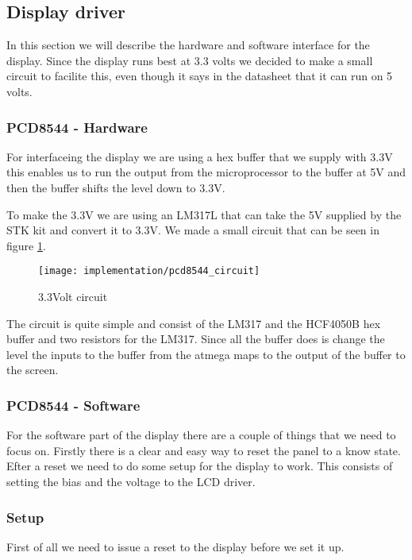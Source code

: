 \subsection{Display driver}
In this section we will describe the hardware and software interface for the display.
Since the display runs best at 3.3 volts we decided to make a small circuit to facilite this,
even though it says in the datasheet\cite[p. 17]{philips:pcd8544} that it can run on 5 volts.

\subsubsection{PCD8544 - Hardware}
For interfaceing the display we are using a hex buffer that we supply with 3.3V this enables us to run the output from the
microprocessor to the buffer at 5V and then the buffer shifts the level down to 3.3V\cite[p. 1]{STMicroelectronics:HCF4050B}.

To make the 3.3V we are using an LM317L that can take the 5V supplied by the STK kit and convert it to 3.3V. 
We made a small circuit that can be seen in figure \ref{fig:pcd8544_circuit}.

\begin{figure}
	\centering
	\texttt{[image: implementation/pcd8544\_circuit]}
	\caption{3.3Volt circuit}
	\label{fig:pcd8544_circuit}
\end{figure}

The circuit is quite simple and consist of the LM317 and the HCF4050B hex buffer and two resistors for the LM317.
Since all the buffer does is change the level the inputs to the buffer from the atmega maps to the output of the buffer to the screen.


\subsubsection{PCD8544 - Software}
For the software part of the display there are a couple of things that we need to focus on.
Firstly there is a clear and easy way to reset the panel to a know state. Efter a reset we need to do some setup for the display to work.
This consists of setting the bias and the voltage to the LCD driver.

\subsubsection{Setup}
First of all we need to issue a reset to the display before we set it up.

